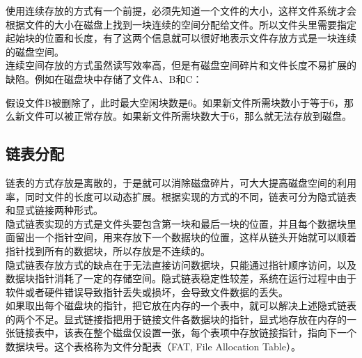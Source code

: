 使用连续存放的方式有一个前提，必须先知道一个文件的大小，这样文件系统才会根据文件的大小在磁盘上找到一块连续的空间分配给文件。所以文件头里需要指定起始块的位置和长度，有了这两个信息就可以很好地表示文件存放方式是一块连续的磁盘空间。\\

连续空间存放的方式虽然读写效率高，但是有磁盘空间碎片和文件长度不易扩展的缺陷。例如在磁盘块中存储了文件A、B和C：

\begin{table}[H]
	\centering
\end{table}

假设文件B被删除了，此时最大空闲块数是6。如果新文件所需块数小于等于6，那么新文件可以被正常存放。如果新文件所需块数大于6，那么就无法存放到磁盘。\\

\subsection{链表分配}

链表的方式存放是离散的，于是就可以消除磁盘碎片，可大大提高磁盘空间的利用率，同时文件的长度可以动态扩展。根据实现的方式的不同，链表可分为隐式链表和显式链接两种形式。\\

隐式链表实现的方式是文件头要包含第一块和最后一块的位置，并且每个数据块里面留出一个指针空间，用来存放下一个数据块的位置，这样从链头开始就可以顺着指针找到所有的数据块，所以存放是不连续的。\\

隐式链表存放方式的缺点在于无法直接访问数据块，只能通过指针顺序访问，以及数据块指针消耗了一定的存储空间。隐式链表稳定性较差，系统在运行过程中由于软件或者硬件错误导致指针丢失或损坏，会导致文件数据的丢失。\\

如果取出每个磁盘块的指针，把它放在内存的一个表中，就可以解决上述隐式链表的两个不足。显式链接指把用于链接文件各数据块的指针，显式地存放在内存的一张链接表中，该表在整个磁盘仅设置一张，每个表项中存放链接指针，指向下一个数据块号。这个表格称为文件分配表（FAT, File Allocation Table）。

